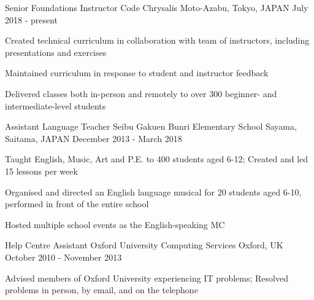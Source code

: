 \begin{cventries}
  \cventry
  {Senior Foundations Instructor} %
  {Code Chrysalis} %
  {Moto-Azabu, Tokyo, JAPAN} %
  {July 2018 - present} %
  {
    \begin{cvitems} %
      \item {Created technical curriculum in collaboration with team of instructors, including presentations and exercises}
      \item {Maintained curriculum in response to student and instructor feedback}
      \item {Delivered classes both in-person and remotely to over 300 beginner- and intermediate-level students}
    \end{cvitems}
  }

  \cventry
  {Assistant Language Teacher} %
  {Seibu Gakuen Bunri Elementary School} %
  {Sayama, Saitama, JAPAN} %
  {December 2013 - March 2018} %
  {
    \begin{cvitems} %
      \item {Taught English, Music, Art and P.E. to 400 students aged 6-12; Created and led 15 lessons per week}
      \item {Organised and directed an English language musical for 20 students aged 6-10, performed in front of the entire school}
      \item {Hosted multiple school events as the English-speaking MC}
    \end{cvitems}
  }

  \cventry
  {Help Centre Assistant} %
  {Oxford University Computing Services} %
  {Oxford, UK} %
  {October 2010 - November 2013} %
  {
    \begin{cvitems} %
      \item {Advised members of Oxford University experiencing IT problems; Resolved problems in person, by email, and on the telephone}
    \end{cvitems}
  }

\end{cventries}
